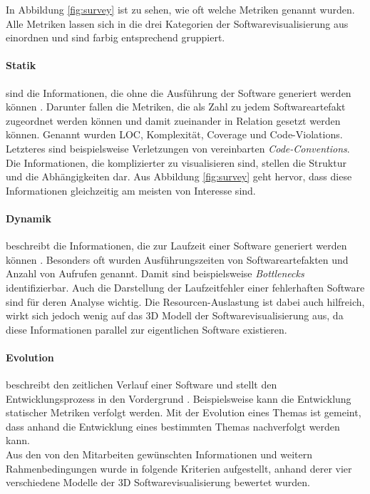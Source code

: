 In Abbildung \ref{fig:survey} ist zu sehen, wie oft welche Metriken genannt wurden. Alle Metriken lassen sich in die drei Kategorien der Softwarevisualisierung aus \cite{diehl2007software} einordnen und sind farbig entsprechend gruppiert.

\paragraph{Statik} sind die Informationen, die ohne die Ausführung der Software generiert werden können \cite{diehl2007software}. Darunter fallen die Metriken, die als Zahl zu jedem Softwareartefakt zugeordnet werden können und damit zueinander in Relation gesetzt werden können. Genannt wurden LOC, Komplexität, Coverage und Code-Violations. Letzteres sind beispielsweise Verletzungen von vereinbarten \emph{Code-Conventions}. Die Informationen, die komplizierter zu visualisieren sind, stellen die Struktur und die Abhängigkeiten dar. Aus Abbildung \ref{fig:survey} geht hervor, dass diese Informationen gleichzeitig am meisten von Interesse sind.

\paragraph{Dynamik} beschreibt die Informationen, die zur Laufzeit einer Software generiert werden können \cite{diehl2007software}. Besonders oft wurden Ausführungszeiten von Softwareartefakten und Anzahl von Aufrufen genannt. Damit sind beispielsweise \emph{Bottlenecks} identifizierbar. Auch die Darstellung der Laufzeitfehler einer fehlerhaften Software sind für deren Analyse wichtig. Die Resourcen-Auslastung ist dabei auch hilfreich, wirkt sich jedoch wenig auf das 3D Modell der Softwarevisualisierung aus, da diese Informationen parallel zur eigentlichen Software existieren.

\paragraph{Evolution} beschreibt den zeitlichen Verlauf einer Software und stellt den Entwicklungsprozess in den Vordergrund \cite{diehl2007software}. Beispielsweise kann die Entwicklung statischer Metriken verfolgt werden. Mit der Evolution eines Themas ist gemeint, dass anhand die Entwicklung eines bestimmten Themas nachverfolgt werden kann.\\

Aus den von den Mitarbeiten gewünschten Informationen und weitern Rahmenbedingungen wurde in \cite{puetz2017softwarevisualisierung} folgende Kriterien aufgestellt, anhand derer vier verschiedene Modelle der 3D Softwarevisualisierung bewertet wurden.

